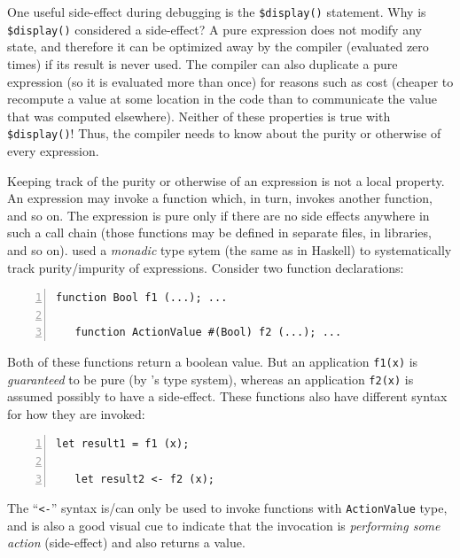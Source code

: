 One useful side-effect during debugging is the {\tt \$display()}
statement.  Why is {\tt \$display()} considered a side-effect?  A pure
expression does not modify any state, and therefore it can be
optimized away by the compiler (evaluated zero times) if its result is
never used.  The compiler can also duplicate a pure expression (so it
is evaluated more than once) for reasons such as cost (cheaper to
recompute a value at some location in the code than to communicate the
value that was computed elsewhere).  Neither of these properties is
true with {\tt \$display()}!  Thus, the compiler needs to know about
the purity or otherwise of every expression.

Keeping track of the purity or otherwise of an expression is not a
local property.  An expression may invoke a function which, in turn,
invokes another function, and so on.  The expression is pure only if
there are no side effects anywhere in such a call chain (those
functions may be defined in separate files, in libraries, and so on).
{\BSV} used a \emph{monadic} type sytem (the same as in Haskell) to
systematically track purity/impurity of expressions.  Consider two
function declarations:


{\footnotesize
\begin{Verbatim}[frame=single, numbers=left]
   function Bool f1 (...); ...

   function ActionValue #(Bool) f2 (...); ...
\end{Verbatim}
}

Both of these functions return a boolean value.  But an application
{\tt f1(x)} is \emph{guaranteed} to be pure (by {\BSV}'s type system),
whereas an application {\tt f2(x)} is assumed possibly to have a
side-effect.  These functions also have different syntax for how they
are invoked:

{\footnotesize
\begin{Verbatim}[frame=single, numbers=left]
   let result1 = f1 (x);

   let result2 <- f2 (x);
\end{Verbatim}
}

The ``\verb|<-|'' syntax is/can only be used to invoke functions with
\verb|ActionValue| type, and is also a good visual cue to indicate
that the invocation is \emph{performing some action} (side-effect) and
also returns a value.

